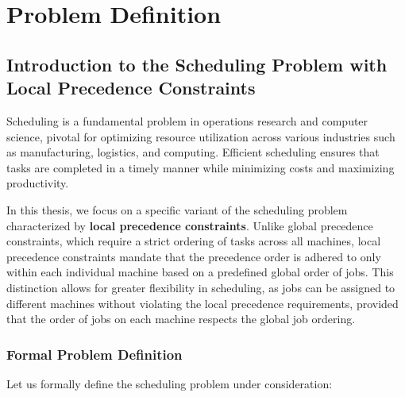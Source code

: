\chapter{Problem Definition}


\section{Introduction to the Scheduling Problem with Local Precedence Constraints}

Scheduling is a fundamental problem in operations research and computer science, pivotal for optimizing resource utilization across various industries such as manufacturing, logistics, and computing. Efficient scheduling ensures that tasks are completed in a timely manner while minimizing costs and maximizing productivity.

In this thesis, we focus on a specific variant of the scheduling problem characterized by \textbf{local precedence constraints}. Unlike global precedence constraints, which require a strict ordering of tasks across all machines, local precedence constraints mandate that the precedence order is adhered to only within each individual machine based on a predefined global order of jobs. This distinction allows for greater flexibility in scheduling, as jobs can be assigned to different machines without violating the local precedence requirements, provided that the order of jobs on each machine respects the global job ordering.

\subsection{Formal Problem Definition}

Let us formally define the scheduling problem under consideration:

